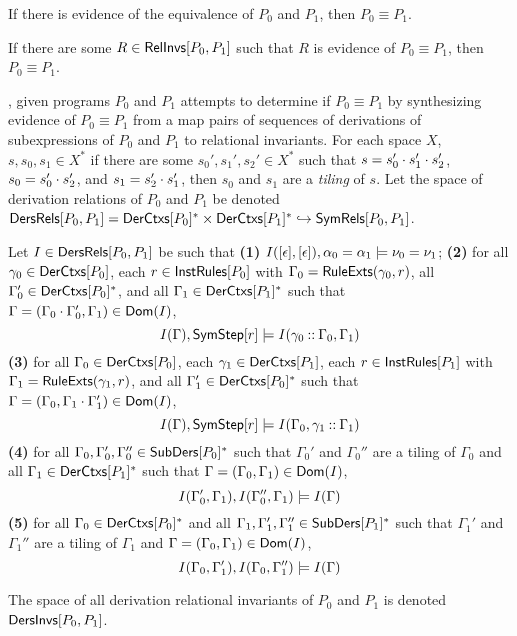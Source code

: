If there is evidence of the equivalence of $P_0$ and $P_1$, then $P_0
\equiv P_1$.
%
\begin{lemma}
  \label{lemma:equiv-evidence}
  If there are some $R \in \mathsf{RelInvs}[ P_0, P_1 ]$ such that $R$ is
  evidence of $P_0 \equiv P_1$, then $P_0 \equiv P_1$.
\end{lemma}

\sys, given programs $P_0$ and $P_1$ attempts to determine if $P_0
\equiv P_1$ by synthesizing evidence of $P_0 \equiv P_1$ from a map
pairs of sequences of derivations of subexpressions of $P_0$ and $P_1$
to relational invariants.
For each space $X$, $s, s_0, s_1 \in X^{*}$ if there are some $s_0',
s_1', s_2' \in X^{*}$ such that $s = s_0' \cdot s_1' \cdot s_2'$,
$s_0 = s_0' \cdot s_2'$, and $s_1 = s_2' \cdot s_1'$, then $s_0$
and $s_1$ are a \emph{tiling} of $s$.
%
Let the space of derivation relations of $P_0$ and $P_1$ be denoted
$\mathsf{DersRels}[  P_0 ,  P_1  ] = \mathsf{DerCtxs}[ P_0 ]^{*} \times
\mathsf{DerCtxs}[ P_1 ]^{*} \hookrightarrow \mathsf{SymRels}[ P_0, P_1 ]$.
%
\begin{defn}
  \label{defn:der-invs}
  Let $I \in \mathsf{DersRels}[  P_0 ,  P_1  ] $ be such that
  \textbf{(1)} $I([ \epsilon ], [ \epsilon ]), \alpha_0 = \alpha_1
  \models \nu_0 = \nu_1$;
  \textbf{(2)} for all $\gamma_0 \in \mathsf{DerCtxs}[  P_0  ]$, %
  each $r \in \mathsf{InstRules}[  P_0  ]$ with $\Gamma_0 = \mathsf{RuleExts}( \gamma_0,
  r) $, %
  all $\Gamma_0' \in \mathsf{DerCtxs}[  P_0  ]^{*}$, and %
  all $\Gamma_1 \in \mathsf{DerCtxs}[ P_1 ]^{*}$ such that $\Gamma = (\Gamma_0
  \cdot \Gamma_0', \Gamma_1) \in \mathsf{Dom}(I)$,
  \[ I(\Gamma), \symstep{ r } \entails %
  I( \gamma_0 \cons \Gamma_0, \Gamma_1) \]
  \textbf{(3)} for all $\Gamma_0 \in \mathsf{DerCtxs}[  P_0  ]$, %
  each $\gamma_1 \in \mathsf{DerCtxs}[  P_1  ]$, %
  each $r \in \mathsf{InstRules}[  P_1  ]$ with $\Gamma_1 = \mathsf{RuleExts}( \gamma_1,
  r)$, and %
  all $\Gamma_1' \in \mathsf{DerCtxs}[  P_0  ]^{*}$ such that $\Gamma =
  (\Gamma_0, \Gamma_1 \cdot \Gamma_1') \in \mathsf{Dom}(I)$,
  \[ I(\Gamma), \symstep{ r } \entails %
  I( \Gamma_0, \gamma_1 \cons \Gamma_1) \]
  \textbf{(4)} for all $\Gamma_0, \Gamma_0', \Gamma_0'' \in
  \mathsf{SubDers}[ P_0 ]^{*}$ such that $\Gamma_0'$ and $\Gamma_0''$ are a
  tiling of $\Gamma_0$ and all $\Gamma_1 \in \mathsf{DerCtxs}[ P_1 ]^{*}$ such
  that $\Gamma = (\Gamma_0, \Gamma_1) \in \mathsf{Dom}(I)$,
  \[ I(\Gamma_0', \Gamma_1), I(\Gamma_0'', \Gamma_1) \entails %
  I(\Gamma) \]
  \textbf{(5)} for all $\Gamma_0 \in \mathsf{DerCtxs}[ P_0 ]^{*}$ and %
  all $\Gamma_1, \Gamma_1', \Gamma_1'' \in \mathsf{SubDers}[ P_1 ]^{*}$ such
  that $\Gamma_1'$ and $\Gamma_1''$ are a tiling of $\Gamma_1$ and
  $\Gamma = (\Gamma_0, \Gamma_1) \in \mathsf{Dom}(I)$,
  \[ I(\Gamma_0, \Gamma_1'), I(\Gamma_0, \Gamma_1'') \entails %
  I(\Gamma) \]
\end{defn}
%
The space of all derivation relational invariants of $P_0$ and $P_1$
is denoted $\mathsf{DersInvs}[  P_0 ,  P_1  ]$.
%

